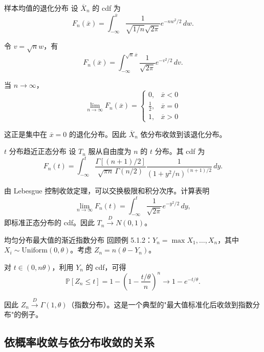 \begin{example}{样本均值的退化分布}\label{ex:sample-mean-degenerate}
设 $\overline{X}_n$ 的 cdf 为
\[
F_n(\overline{x}) = \int_{-\infty}^{\overline{x}} \frac{1}{\sqrt{1/n}\sqrt{2\pi}} e^{-nw^2/2}\,dw.
\]

令 $v = \sqrt{n}w$，有
\[
F_n(\overline{x}) = \int_{-\infty}^{\sqrt{n}\,\overline{x}} \frac{1}{\sqrt{2\pi}} e^{-v^2/2}\,dv.
\]

当 $n \to \infty$，
\[
\lim_{n \to \infty} F_n(\overline{x}) = \begin{cases}
0, & \overline{x} < 0 \\
\frac{1}{2}, & \overline{x} = 0 \\
1, & \overline{x} > 0
\end{cases}
\label{eq:degenerate-cdf}
\]

这正是集中在 $\overline{x} = 0$ 的退化分布。因此 $\overline{X}_n$ 依分布收敛到该退化分布。%
\end{example}

\begin{example}{$t$ 分布趋近正态分布}\label{ex:t-to-normal}
设 $T_n$ 服从自由度为 $n$ 的 $t$ 分布。其 cdf 为
\[
F_n(t) = \int_{-\infty}^{t} \frac{\Gamma[(n+1)/2]}{\sqrt{\pi n}\,\Gamma(n/2)} \frac{1}{(1+y^2/n)^{(n+1)/2}}\,dy.
\label{eq:t-distribution-cdf}
\]

由 Lebesgue 控制收敛定理，可以交换极限和积分次序。计算表明
\[
\lim_{n \to \infty} F_n(t) = \int_{-\infty}^{t} \frac{1}{\sqrt{2\pi}} e^{-y^2/2}\,dy,
\]
即标准正态分布的 cdf。因此 $T_n \xrightarrow{D} N(0,1)$。%
\end{example}

\begin{example}{均匀分布最大值的渐近指数分布}\label{ex:uniform-max-exponential}
回顾例 5.1.2：$Y_n = \max{X_1, \ldots, X_n}$，其中 $X_i \sim \mathrm{Uniform}(0,\theta)$。考虑 $Z_n = n(\theta - Y_n)$。

对 $t \in (0, n\theta)$，利用 $Y_n$ 的 cdf，可得
\[
\mathbb{P}[Z_n \leq t] = 1 - \left(1 - \frac{t/\theta}{n}\right)^n \to 1 - e^{-t/\theta}.
\label{eq:exponential-limit}
\]

因此 $Z_n \xrightarrow{D} \Gamma(1,\theta)$（指数分布）。这是一个典型的"最大值标准化后收敛到指数分布"的例子。%
\end{example}

\subsection{依概率收敛与依分布收敛的关系}

